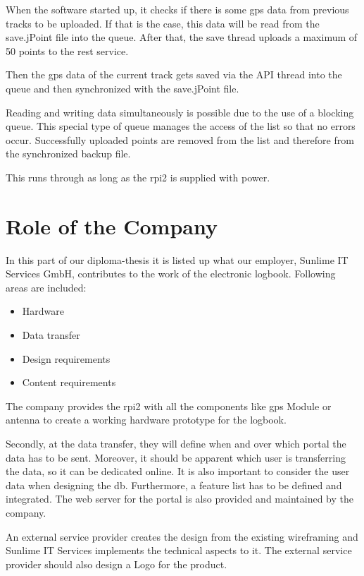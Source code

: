 When the software started up, it checks if there is some \gls{gps} data from previous tracks to be uploaded. If that is the case, this data will be read from the save.jPoint file into the queue. After that, the save thread uploads a maximum of 50 points to the \gls{rest} service. 


Then the \gls{gps} data of the current track gets saved via the API thread into the queue and then synchronized with the save.jPoint file.

Reading and writing data simultaneously is possible due to the use of a blocking queue. This special type of queue manages the access of the list so that no errors occur.\newline
Successfully uploaded points are removed from the list and therefore from the synchronized backup file.

This runs through as long as the \gls{rpi2} is supplied with power.
\clearpageauthor

\newpage
\section*{Role of the Company}
In this part of our diploma-thesis it is listed up what our employer, Sunlime IT Services GmbH, contributes to the work of the electronic logbook. Following areas are included:
\begin{itemize}
\item Hardware
\item Data transfer
\item Design requirements
\item Content requirements
\end{itemize}
The company provides the \gls{rpi2} with all the components like \gls{gps} Module or antenna to create a working hardware prototype for the logbook.

Secondly, at the data transfer, they will define when and over which portal the data has to be sent. Moreover, it should be apparent which user is transferring the data, so it can be dedicated online. It is also important to consider the user data when designing the \gls{db}. Furthermore, a feature list has to be defined and integrated.
The web server for the portal is also provided and maintained by the company.

An external service provider creates the design from the existing wireframing and Sunlime IT Services implements the technical aspects to it. The external service provider should also design a Logo for the product.

